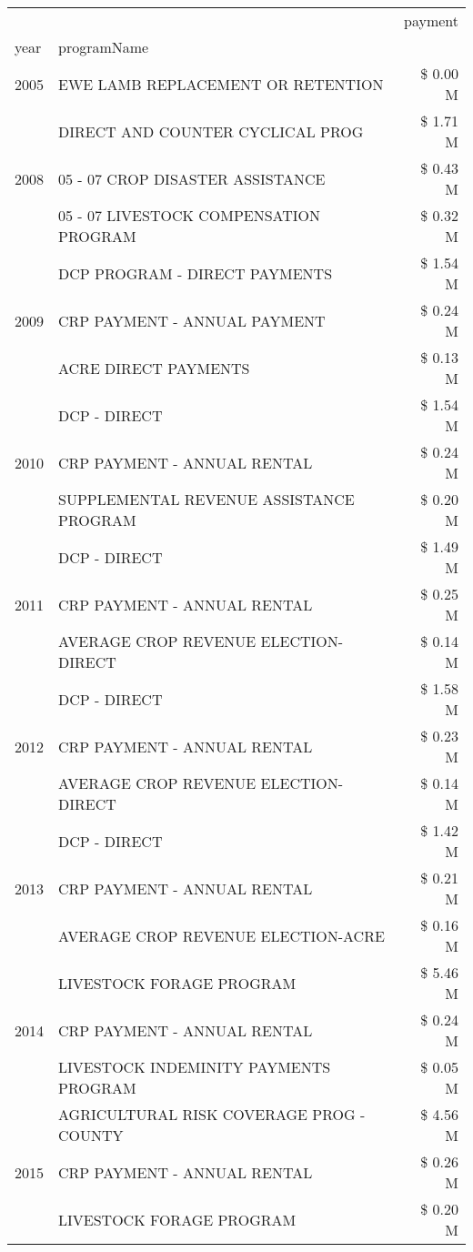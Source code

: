 \begin{tabular}{llr}
\toprule
 &  & payment \\
year & programName &  \\
\midrule
2005 & EWE LAMB REPLACEMENT OR RETENTION & \$ 0.00 M \\
\cline{1-3}
\multirow[t]{3}{*}{2008} & DIRECT AND COUNTER CYCLICAL PROG & \$ 1.71 M \\
 & 05 - 07 CROP DISASTER ASSISTANCE & \$ 0.43 M \\
 & 05 - 07 LIVESTOCK COMPENSATION PROGRAM & \$ 0.32 M \\
\cline{1-3}
\multirow[t]{3}{*}{2009} & DCP PROGRAM - DIRECT PAYMENTS & \$ 1.54 M \\
 & CRP PAYMENT - ANNUAL PAYMENT & \$ 0.24 M \\
 & ACRE DIRECT PAYMENTS & \$ 0.13 M \\
\cline{1-3}
\multirow[t]{3}{*}{2010} & DCP - DIRECT & \$ 1.54 M \\
 & CRP PAYMENT - ANNUAL RENTAL & \$ 0.24 M \\
 & SUPPLEMENTAL REVENUE ASSISTANCE PROGRAM & \$ 0.20 M \\
\cline{1-3}
\multirow[t]{3}{*}{2011} & DCP - DIRECT & \$ 1.49 M \\
 & CRP PAYMENT - ANNUAL RENTAL & \$ 0.25 M \\
 & AVERAGE CROP REVENUE ELECTION-DIRECT & \$ 0.14 M \\
\cline{1-3}
\multirow[t]{3}{*}{2012} & DCP - DIRECT & \$ 1.58 M \\
 & CRP PAYMENT - ANNUAL RENTAL & \$ 0.23 M \\
 & AVERAGE CROP REVENUE ELECTION-DIRECT & \$ 0.14 M \\
\cline{1-3}
\multirow[t]{3}{*}{2013} & DCP - DIRECT & \$ 1.42 M \\
 & CRP PAYMENT - ANNUAL RENTAL & \$ 0.21 M \\
 & AVERAGE CROP REVENUE ELECTION-ACRE & \$ 0.16 M \\
\cline{1-3}
\multirow[t]{3}{*}{2014} & LIVESTOCK FORAGE PROGRAM & \$ 5.46 M \\
 & CRP PAYMENT - ANNUAL RENTAL & \$ 0.24 M \\
 & LIVESTOCK INDEMINITY PAYMENTS PROGRAM & \$ 0.05 M \\
\cline{1-3}
\multirow[t]{3}{*}{2015} & AGRICULTURAL RISK COVERAGE PROG - COUNTY & \$ 4.56 M \\
 & CRP PAYMENT - ANNUAL RENTAL & \$ 0.26 M \\
 & LIVESTOCK FORAGE PROGRAM & \$ 0.20 M \\

\end{tabular}
